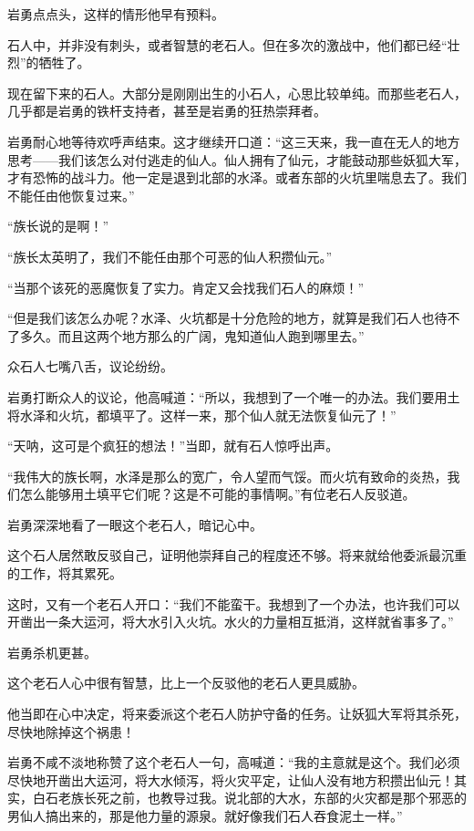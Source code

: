 \begin{this_body}
岩勇点点头，这样的情形他早有预料。

石人中，并非没有刺头，或者智慧的老石人。但在多次的激战中，他们都已经“壮烈”的牺牲了。

现在留下来的石人。大部分是刚刚出生的小石人，心思比较单纯。而那些老石人，几乎都是岩勇的铁杆支持者，甚至是岩勇的狂热崇拜者。

岩勇耐心地等待欢呼声结束。这才继续开口道：“这三天来，我一直在无人的地方思考——我们该怎么对付逃走的仙人。仙人拥有了仙元，才能鼓动那些妖狐大军，才有恐怖的战斗力。他一定是退到北部的水泽。或者东部的火坑里喘息去了。我们不能任由他恢复过来。”

“族长说的是啊！”

“族长太英明了，我们不能任由那个可恶的仙人积攒仙元。”

“当那个该死的恶魔恢复了实力。肯定又会找我们石人的麻烦！”

“但是我们该怎么办呢？水泽、火坑都是十分危险的地方，就算是我们石人也待不了多久。而且这两个地方那么的广阔，鬼知道仙人跑到哪里去。”

众石人七嘴八舌，议论纷纷。

岩勇打断众人的议论，他高喊道：“所以，我想到了一个唯一的办法。我们要用土将水泽和火坑，都填平了。这样一来，那个仙人就无法恢复仙元了！”

“天呐，这可是个疯狂的想法！”当即，就有石人惊呼出声。

“我伟大的族长啊，水泽是那么的宽广，令人望而气馁。而火坑有致命的炎热，我们怎么能够用土填平它们呢？这是不可能的事情啊。”有位老石人反驳道。

岩勇深深地看了一眼这个老石人，暗记心中。

这个石人居然敢反驳自己，证明他崇拜自己的程度还不够。将来就给他委派最沉重的工作，将其累死。

这时，又有一个老石人开口：“我们不能蛮干。我想到了一个办法，也许我们可以开凿出一条大运河，将大水引入火坑。水火的力量相互抵消，这样就省事多了。”

岩勇杀机更甚。

这个老石人心中很有智慧，比上一个反驳他的老石人更具威胁。

他当即在心中决定，将来委派这个老石人防护守备的任务。让妖狐大军将其杀死，尽快地除掉这个祸患！

岩勇不咸不淡地称赞了这个老石人一句，高喊道：“我的主意就是这个。我们必须尽快地开凿出大运河，将大水倾泻，将火灾平定，让仙人没有地方积攒出仙元！其实，白石老族长死之前，也教导过我。说北部的大水，东部的火灾都是那个邪恶的男仙人搞出来的，那是他力量的源泉。就好像我们石人吞食泥土一样。”


\end{this_body}

